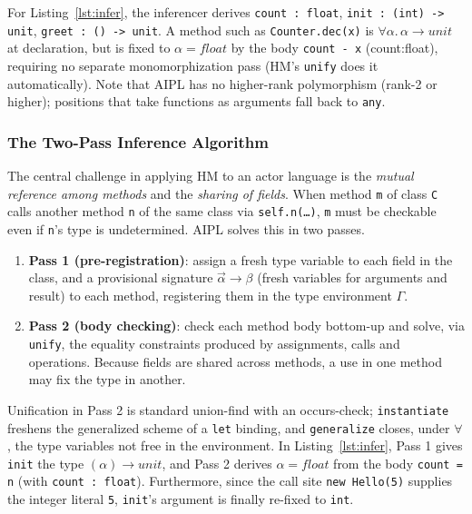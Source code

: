 \documentclass[11pt,a4paper]{article}
\newcommand{\code}[1]{\texttt{\small #1}}
\begin{document}
For Listing~\ref{lst:infer}, the inferencer derives
\code{count : float}, \code{init : (int) -> unit},
\code{greet : () -> unit}. A method such as \code{Counter.dec(x)} is
$\forall \alpha.\,\alpha \to \mathit{unit}$ at declaration, but is fixed
to $\alpha = \mathit{float}$ by the body \code{count - x}
(count:float), requiring no separate monomorphization pass
(HM's \code{unify} does it automatically). Note that AIPL has no
higher-rank polymorphism (rank-2 or higher); positions that take
functions as arguments fall back to \code{any}.

\subsubsection{The Two-Pass Inference Algorithm}
The central challenge in applying HM to an actor language is the
\emph{mutual reference among methods} and the \emph{sharing of fields}.
When method \code{m} of class \code{C} calls another method \code{n} of
the same class via \code{self.n(\dots)}, \code{m} must be checkable even
if \code{n}'s type is undetermined. AIPL solves this in two passes.

\begin{enumerate}[leftmargin=1.6em,itemsep=2pt]
  \item \textbf{Pass 1 (pre-registration)}: assign a fresh type variable
        to each field in the class, and a provisional signature
        $\vec{\alpha}\to\beta$ (fresh variables for arguments and
        result) to each method, registering them in the type
        environment $\Gamma$.
  \item \textbf{Pass 2 (body checking)}: check each method body
        bottom-up and solve, via \code{unify}, the equality constraints
        produced by assignments, calls and operations. Because fields
        are shared across methods, a use in one method may fix the type
        in another.
\end{enumerate}

Unification in Pass 2 is standard union-find with an occurs-check;
\code{instantiate} freshens the generalized scheme of a \code{let}
binding, and \code{generalize} closes, under $\forall$, the type
variables not free in the environment. In Listing~\ref{lst:infer},
Pass 1 gives \code{init} the type $(\alpha)\to\mathit{unit}$, and Pass 2
derives $\alpha = \mathit{float}$ from the body \code{count = n}
(with \code{count : float}). Furthermore, since the call site
\code{new Hello(5)} supplies the integer literal \code{5}, \code{init}'s
argument is finally re-fixed to \code{int}.
\end{document}
